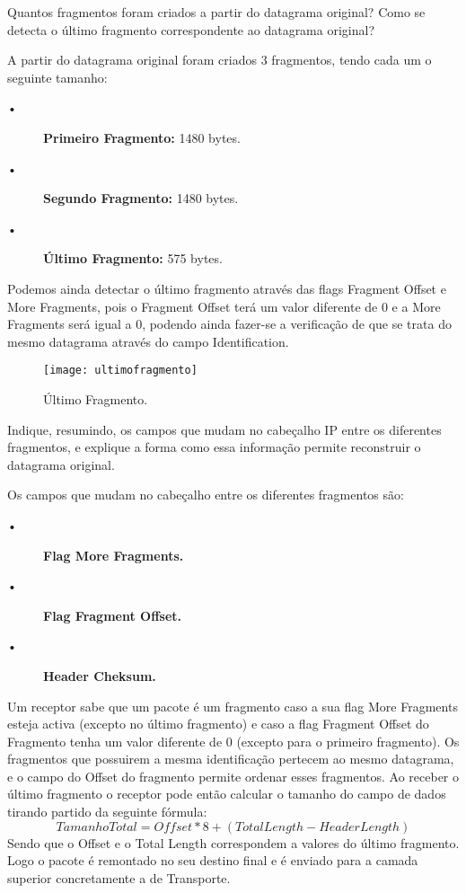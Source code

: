 \documentclass{exam}
\begin{document}
\begin{questions}
\question Quantos fragmentos foram criados a partir do datagrama original? 
Como se detecta o último fragmento correspondente ao datagrama original?
\begin{solution}[.2in]
A partir do datagrama original foram criados 3 fragmentos, 
tendo cada um o seguinte tamanho:
\begin{description}
	\item[•] \textbf{Primeiro Fragmento:} 1480 bytes.
	\item[•] \textbf{Segundo Fragmento:} 1480 bytes.
	\item[•] \textbf{Último Fragmento:} 575 bytes.
\end{description}	
Podemos ainda detectar o último fragmento através das flags Fragment 
Offset e More Fragments, pois o Fragment Offset terá um valor diferente 
de 0 e a More Fragments será igual a 0, podendo ainda fazer-se a 
verificação de que se trata do mesmo datagrama através do campo 
Identification.
\begin{figure}[H]
\centering\texttt{[image: ultimofragmento]} 
\caption{\label{fig:controller}Último Fragmento.}
\end{figure} 
\end{solution}

\question Indique, resumindo, os campos que mudam no cabeçalho IP entre 
os diferentes fragmentos, e explique a forma como essa informação permite
reconstruir o datagrama original.

\begin{solution}[.2in]
Os campos que mudam no cabeçalho entre os diferentes fragmentos são:
\begin{description}
	\item[•] \textbf{Flag More Fragments.} 
	\item[•] \textbf{Flag Fragment Offset.}
	\item[•] \textbf{Header Cheksum.}  
\end{description}
Um receptor sabe que um pacote é um fragmento caso a sua flag More Fragments esteja activa (excepto no último fragmento) e caso a
flag Fragment Offset do Fragmento tenha um valor diferente de 0 (excepto para o primeiro fragmento). Os fragmentos que possuirem a mesma identificação
pertecem ao mesmo datagrama, e o campo do Offset do fragmento permite ordenar esses fragmentos.
Ao receber o último fragmento o receptor pode então calcular o tamanho do campo de dados tirando partido da seguinte fórmula:
\begin{equation}
Tamanho Total=Offset*8 + (Total Length-Header Length)
\end{equation}
Sendo que o Offset e o Total Length correspondem a valores do último fragmento. Logo o pacote é remontado no seu destino final e
é enviado para a camada superior concretamente a de Transporte.
\end{solution}
\end{questions}
\end{document}
